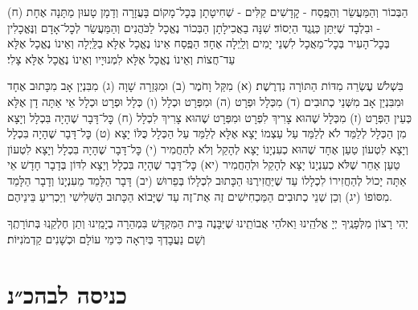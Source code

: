 (ח) הַבְּכוֹר וְהַמַּעֲשֵׂר וְהַפֶּֽסַח - קׇדָשִׁים קַלִּים - שְׁחִיטָתָן בְּכׇל־מָקוֹם בָּעֲזָרָה \middot וְדָמָן טָעוּן מַתָּנָה אֶחָת - וּבִלְבָד שֶׁיִּתֵּן כְּנֶֽגֶד הַיְסוֹד׃ שִׁנָּה בַאֲכִילָתָן \middot הַבְּכוֹר נֶאֱכָל לַכֹּהֲנִים \middot וְהַמַּעֲשֵׂר לְכׇל־אָדָם \middot וְנֶּאֱכָלִין בְּכׇל־הָעִיר בְּכׇל־מַאֲכָל לִשְׁנֵי יָמִים וְלַֽיְלָה אֶחָד׃ הַפֶּֽסַח אֵינוֹ נֶאֱכָל אֶלָּא בַלַּֽיְלָה וְאֵינוֹ נֶאֱכָל אֶלָּא עַד־חֲצוֹת וְאֵינוֹ נֶאֱכָל אֶלָּא לִמְנוּיָיו וְאֵינוֹ נֶאֱכָל אֶלָּא צָלִי׃

בִּשְׁלֹשׁ עֶשְׂרֵה מִדּוֹת הַתּוֹרָה נִדְרֶשֶׁת׃\hfill \break
(א) מִקַּל וָחֹמֶר (ב) וּמִגְּזֵרָה שָׁוָה (ג) מִבִּנְיַן אָב מִכָּתוּב אֶחָד \middot וּמִבִּנְיַן אָב מִשְּׁנֵי כְתוּבִים (ד) מִכְּלָל וּפְרָט (ה) וּמִפְּרָט וּכְלָל (ו) כְּלָל וּפְרָט וּכְלָל \middot אֵי אַתָּה דָן אֶלָּא כְּעֵין הַפְּרָט (ז) מִכְּלָל שֶׁהוּא צָרִיךְ לִפְרָט \middot וּמִפְּרָט שֶׁהוּא צָרִיךְ לִכְלָל (ח) כׇּל־דָּבָר שֶׁהָיָה בִּכְלָל וְיָצָא מִן הַכְּלָל לְלַמֵּד \middot לֹא לְלַמֵּד עַל עַצְמוֹ יָצָא אֶלָּא לְלַמֵּד עַל הַכְּלָל כֻּלּוֹ יָצָא (ט) כׇּל־דָּבָר שֶׁהָיָה בִּכְלָל וְיָצָא לִטְעוֹן טַעַן אֶחָד שֶׁהוּא כְעִנְיָנוֹ \middot יָצָא לְהָקֵל וְלֹא לְהַחֲמִיר (י) כׇּל־דָּבָר שֶׁהָיָה בִּכְלָל וְיָצָא לִטְעוֹן טַעַן אַחֵר שֶׁלֹּא כְעִנְיָנוֹ \middot יָצָא לְהָקֵל וּלְהַחֲמִיר (יא) כׇּל־דָּבָר שֶׁהָיָה בִּכְלָל וְיָצָא לִדּוֹן בְּדָבָר חָדָשׁ \middot אֵי אַתָּה יָכוֹל לְהַחֲזִירוֹ לִכְלָלוֹ עַד שֶׁיַּחֲזִירֶנּוּ הַכָּתוּב לִכְלָלוֹ בְּפֵרוּשׁ (יב) דָּבָר הַלָּמֵד מֵעִנְיָנוֹ \middot וְדָבָר הַלָּמֵד מִסּוֹפוֹ (יג) וְכֵן שְׁנֵי כְתוּבִים הַמַּכְחִישִׁים זֶה אֶת־זֶה \middot עַד שֶׁיָּבוֹא הַכָּתוּב הַשְּׁלִישִׁי וְיַכְרִיעַ בֵּינֵיהֶם.

יְהִי רָצוֹן מִלְּפָנֶֽיךָ יְיָ אֱלֹהֵֽינוּ וֵאלֹהֵי אֲבוֹתֵֽינוּ שֶׁיִּבָּנֶה בֵּית הַמִּקְדָּשׁ בִּמְהֵרָה בְיָמֵֽינוּ וְתֵן חֶלְקֵֽנוּ בְּתוֹרָתֶֽךָ \middot וְשָׁם נַעֲבׇדְךָ בְּיִרְאָה כִּימֵי עוֹלָם וּכְשָׁנִים קַדְמֹנִיּוֹת׃

\rabbiskaddish

\section[כניסה לבהכ״נ]{ כניסה לבהכ״נ }

